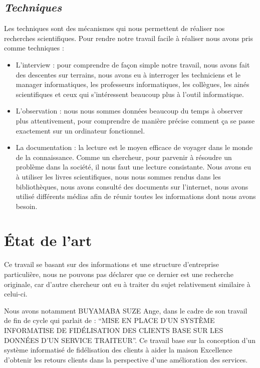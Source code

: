         \subsection[Techniques]{\textit{Techniques}}
        Les techniques sont des mécanismes qui nous permettent de réaliser nos recherches
        scientifiques. Pour rendre notre travail facile à réaliser nous avons pris comme techniques : 
        \newline
        \begin{itemize}
            \item [\ding{226}] L’interview : pour comprendre de façon simple notre travail, nous avons fait des
            descentes sur terrains, nous avons eu à interroger les techniciens et le manager
            informatiques, les professeurs informatiques, les collègues, les ainés scientifiques
            et ceux qui s’intéressent beaucoup plus à l’outil informatique.
            \newline
            \item [\ding{226}] L’observation : nous nous sommes données beaucoup du temps à observer plus
            attentivement, pour comprendre de manière précise comment ça se passe exactement sur un ordinateur fonctionnel.
            \newline
            \item [\ding{226}] La documentation : la lecture est le moyen efficace de voyager dans le monde
            de la connaissance. Comme un chercheur, pour parvenir à résoudre un problème
            dans la société, il nous faut une lecture consistante. Nous avons eu à utiliser les
            livres scientifiques, nous nous sommes rendus dans les bibliothèques, nous avons
            consulté des documents sur l’internet, nous avons utilisé différents médias afin de
            réunir toutes les informations dont nous avons besoin.
        \end{itemize}
    \section[Etat de l'art]{État de l’art}
    Ce travail se basant sur des informations et une structure d’entreprise particulière, nous ne
    pouvons pas déclarer que ce dernier est une recherche originale, car d’autre chercheur ont eu
    à traiter du sujet relativement similaire à celui-ci.
    \newline

    Nous avons notamment BUYAMABA SUZE Ange, dans le cadre de son travail de fin de cycle
    qui parlait de : \enquote{MISE EN PLACE D’UN SYSTÈME INFORMATISE DE FIDÉLISATION DES CLIENTS BASE SUR LES
    DONNÉES D’UN SERVICE TRAITEUR}. Ce travail base sur la conception d’un système informatisé de fidélisation des clients
    à aider la maison Excellence d’obtenir les retours clients dans la perspective d’une amélioration des services. \cite{Buyamba2017}
    \newline

